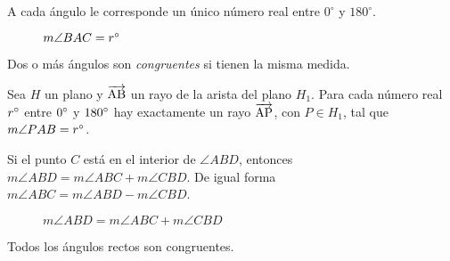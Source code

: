 \begin{postulate}
    A cada ángulo le corresponde un único número real entre $0^{\circ}$ y $180^{\circ}$.

\begin{figure}[!h]
    \centering
    
    \label{fig:angle-measure}
    \caption{$m\angle{BAC}=r^{\circ}$}
\end{figure}

\end{postulate}

\begin{definition}
    Dos o más ángulos son \textit{congruentes} si tienen la misma medida.
\end{definition}

\clearpage

\begin{postulate}
    Sea $H$ un plano y $\overrightarrow{\rm AB}$ un rayo de la arista del plano $H_1$. Para cada número real $r^{\circ}$ entre $0^{\circ}$ y $180^{\circ}$ hay exactamente un rayo $\overrightarrow{\rm AP}$, con $P \in H_1$, tal que $m\angle{PAB} = r^{\circ}$.

    \begin{figure}[!h]
        \centering
        
        \label{fig:angle-construction}
    \end{figure}
    
\end{postulate}

\begin{postulate}
    Si el punto $C$ está en el interior de $\angle{ABD}$, entonces $m\angle{ABD} = m\angle{ABC} + m\angle{CBD}$. De igual forma $m\angle{ABC} = m\angle{ABD} - m\angle{CBD}$.


    \begin{figure}[!h]
        \centering
        
        \label{fig:angle-addition}
        \caption{$m\angle{ABD} = m\angle{ABC} + m\angle{CBD}$}
    \end{figure}
    
\end{postulate}

\begin{postulate}
    Todos los ángulos rectos son congruentes.
    
    \begin{figure}[!h]
        \centering
        
        \label{fig:postulate14}
    \end{figure}
    
\end{postulate}

